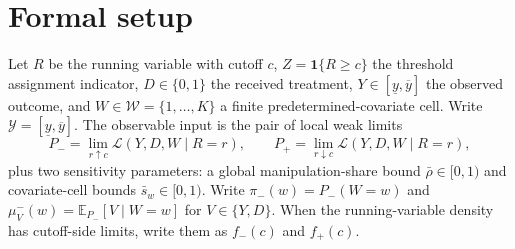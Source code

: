 \documentclass[11pt]{article}
\newcommand{\E}{\mathbb{E}}
\newcommand{\one}{\mathbf{1}}
\theoremstyle{definition}
\theoremstyle{plain}
\theoremstyle{remark}
\begin{document}
\section{Formal setup}
Let \(R\) be the running variable with cutoff \(c\), \(Z=\one\{R\ge c\}\) the threshold
assignment indicator, \(D\in\{0,1\}\) the received treatment, \(Y\in[\underline y,\overline y]\)
the observed outcome, and \(W\in\mathcal W=\{1,\ldots,K\}\) a finite predetermined-covariate
cell.  Write \(\mathcal Y=[\underline y,\overline y]\).  The observable input is the pair of local weak limits
\[
  P_-=\lim_{r\uparrow c}\mathcal L(Y,D,W\mid R=r), \qquad
  P_+=\lim_{r\downarrow c}\mathcal L(Y,D,W\mid R=r),
\]
plus two sensitivity parameters: a global manipulation-share bound \(\bar\rho\in[0,1)\)
and covariate-cell bounds \(\bar s_w\in[0,1)\).  Write \(\pi_-(w)=P_-(W=w)\) and
\(\mu^-_V(w)=\E_{P_-}[V\mid W=w]\) for \(V\in\{Y,D\}\).  When the running-variable
density has cutoff-side limits, write them as \(f_-(c)\) and \(f_+(c)\).
\end{document}
